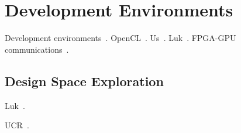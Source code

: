 \section{Development Environments}
\label{sec:dev}

Development environments~\cite{mlk12}.
OpenCL~\cite{Ahmed11}.
Us~\cite{blc17,cft+10,ctg+07,ftb+06,wcc12,wcc13}.
Luk~\cite{ttpl11}.
FPGA-GPU communications~\cite{brf14,tdm13,tdmp15}.

\subsection{Design Space Exploration}

Luk~\cite{ll12,ll11,slkk13}.

UCR~\cite{bbg13}.
